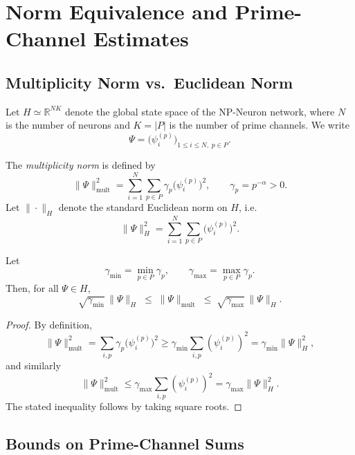 \documentclass[11pt]{article}
\begin{document}
\section{Norm Equivalence and Prime-Channel Estimates}

\subsection{Multiplicity Norm vs.\ Euclidean Norm}

Let \(H \simeq \mathbb{R}^{N K}\) denote the global state space of the NP-Neuron network, where \(N\) is the number of neurons and \(K = |P|\) is the number of prime channels. We write
\[
\Psi = \bigl(\psi_i^{(p)}\bigr)_{1 \le i \le N,\; p \in P}.
\]

The \emph{multiplicity norm} is defined by
\begin{equation}
\label{eq:mult-norm-app}
\|\Psi\|_{\mathrm{mult}}^2
= \sum_{i=1}^N \sum_{p\in P} \gamma_p \bigl(\psi_i^{(p)}\bigr)^2,
\qquad \gamma_p = p^{-\alpha} > 0.
\end{equation}
Let \(\|\cdot\|_H\) denote the standard Euclidean norm on \(H\), i.e.
\[
\|\Psi\|_H^2 = \sum_{i=1}^N \sum_{p\in P} \bigl(\psi_i^{(p)}\bigr)^2.
\]

\begin{lemma}
\label{lem:norm-equivalence}
Let
\[
\gamma_{\min} = \min_{p\in P} \gamma_p, \qquad
\gamma_{\max} = \max_{p\in P} \gamma_p.
\]
Then, for all \(\Psi \in H\),
\begin{equation}
\label{eq:norm-equivalence-app}
\sqrt{\gamma_{\min}}\,\|\Psi\|_H
\;\le\; \|\Psi\|_{\mathrm{mult}}
\;\le\; \sqrt{\gamma_{\max}}\,\|\Psi\|_H.
\end{equation}
\end{lemma}

\begin{proof}
By definition,
\[
\|\Psi\|_{\mathrm{mult}}^2
= \sum_{i,p} \gamma_p \bigl(\psi_i^{(p)}\bigr)^2
\ge \gamma_{\min} \sum_{i,p} (\psi_i^{(p)})^2
= \gamma_{\min} \|\Psi\|_H^2,
\]
and similarly
\[
\|\Psi\|_{\mathrm{mult}}^2
\le \gamma_{\max} \sum_{i,p} (\psi_i^{(p)})^2
= \gamma_{\max} \|\Psi\|_H^2.
\]
The stated inequality follows by taking square roots.
\end{proof}

\subsection{Bounds on Prime-Channel Sums}
\end{document}
